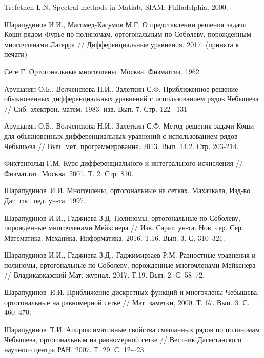 \begin{thebibliography}{111}
{Trefethen L.N.}
Spectral methods in Matlab. SIAM. Philadelphia. 2000.


{Шарапудинов И.И., Магомед-Касумов М.Г.}
О представлении решения задачи Коши  рядом Фурье  по полиномам, ортогональным по  Соболеву, порожденным многочленами Лагерра // Дифференциальные уравнения. 2017. (принята к печати)








Сеге Г. Ортогональные многочлены. Москва. Физматгиз. 1962.


{Арушанян О.Б., Волченскова Н.И., Залеткин С.Ф.}
Приближенное решение обыкновенных дифференциальных уравнений с использованием рядов Чебышева // Сиб. электрон. матем. 1983. изв. Вып. 7. Стр. 122–-131


{Арушанян О.Б., Волченскова Н.И., Залеткин С.Ф.}
 Метод решения задачи Коши для обыкновенных дифференциальных уравнений с использованием рядов Чебышeва // Выч. мет. программирование. 2013. Вып. 14:2. Стр. 203-214.


{Фихтенгольц Г.М.}
Курс дифференциального и интегрального исчисления // Физматлит. Москва. 2001. Т. 2. Стр. 810.


{Шарапудинов~И.И.} Многочлены, ортогональные на сетках. Махачкала, Изд-во Даг. гос. пед. ун-та. 1997.		


{Шарапудинов И.И., Гаджиева З.Д.}
Полиномы, ортогональные по Соболеву, порожденные многочленами Мейкснера // Изв. Сарат. ун-та. Нов. сер. Сер. Математика. Механика. Информатика,
2016. Т.16. Вып. 3. С. 310--321.


{Шарапудинов И.И., Гаджиева З.Д., Гаджимирзаев Р.М.}
Разностные уравнения и полиномы, ортогональные по Соболеву, порожденные многочленами Мейкснера //
Владикавказский Мат. журнал, 2017. Т.19. Вып. 2. С. 58--72.


{Шарапудинов~И.И.}
Приближение дискретных функций и многочлены Чебышева, ортогональные на равномерной сетке //
Мат. заметки, 2000. Т. 67. Вып. 3. С. 460--470.


{Шарапудинов~Т.И.}
Аппроксимативные свойства смешанных рядов по полиномам Чебышева, ортогональным на равномерной сетке //
Вестник Дагестанского научного центра РАН, 2007. Т. 29. С. 12-–23.



\end{thebibliography}
